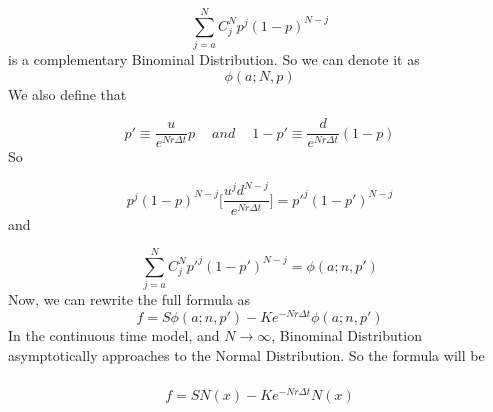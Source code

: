 \documentclass[12pt]{article}
\begin{document}
\[
    \sum_{j=a}^N C^N_j p^j (1-p)^{N-j}
\]
is a complementary Binominal Distribution. So we can denote it as
\[
    \phi(a;N,p)
\]
We also define that

\[
    p'\equiv \frac{u}{e^{Nr\Delta t}}p\quad\  and\quad\  1-p' \equiv \frac{d}{e^{Nr\Delta t}}(1-p)
\]
So

\[
    p^j (1-p)^{N-j} \Bigg[\frac{u^j d^{N-j}}{e^{Nr\Delta t}}\Bigg]=p'^j (1-p')^{N-j}
\]
and

\[
    \sum_{j=a}^N C^N_j p'^j (1-p')^{N-j} = \phi(a;n,p')
\]
Now, we can rewrite the full formula as
\[
    f = S\phi(a;n,p')-Ke^{-Nr\Delta t}\phi(a;n,p')
\]
In the continuous time model, and $N\to\infty$, Binominal Distribution asymptotically approaches to the Normal Distribution. So the formula will be\\\\
\begin{align*}
    f = SN(x)-Ke^{-Nr\Delta t}N(x)
\end{align*}
 
\end{document}
